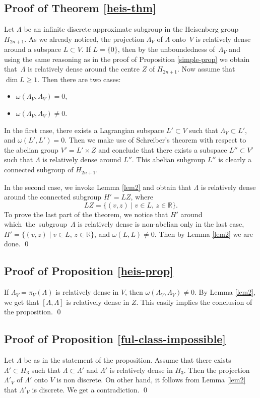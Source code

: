 \documentclass[JEP,XML,SOM,Unicode,NoEqCountersInSection]{cedram}
\newcommand{\bR}{\mathbb{R}}
\theoremstyle{plain}
\theoremstyle{definition}
\begin{document}
\subsection{Proof of Theorem \ref{heis-thm}}
Let $\Lambda$ be an infinite discrete approximate subgroup in the Heisenberg group $H_{2n+1}$. As we already noticed, the projection $\Lambda_V$ of $\Lambda$ onto~$V$ is relatively dense around a subspace $L \subset V$.
If $L = \{ 0 \}$, then by the unboundedness of~$\Lambda_V$ and using the same reasoning as in the proof of Proposition \ref{simple-prop} we obtain that~$\Lambda$ is relatively dense around the centre $Z$ of $H_{2n+1}$. Now assume that $\dim L \ge 1$. Then there are two cases:

\begin{itemize}
\item[(1)] $\omega(\Lambda_V, \Lambda_V) = 0$,
\item[(2)] $\omega(\Lambda_V,\Lambda_V) \neq 0$.
\end{itemize}

In the first case, there exists a Lagrangian subspace $L' \subset V$ such that $\Lambda_V \subset L'$, and $\omega(L',L') = 0$. Then we make use of Schreiber's theorem with respect to the abelian group $V' = L' \times Z$ and conclude that there exists a subspace $L'' \subset V'$ such that $\Lambda$ is relatively dense around $L''$. This abelian subgroup $L''$ is clearly a connected subgroup of $H_{2n+1}$.

In the second case, we invoke Lemma \ref{lem2} and obtain that $\Lambda$ is relatively dense around the connected subgroup
$H' = LZ$, where
\[
LZ = \{ (v,z) \mid v \in L,\, z \in \bR \}.
\]
To prove the last part of the theorem, we notice that $H'$ around which~the~subgroup~$\Lambda$ is relatively dense is non-abelian only in the last case, \ie \hbox{$H' \!=\!\{ (v,z) \mid v\!\in\!L,\, z\!\in\!\bR \}$}, and $\omega(L,L) \neq 0$. Then by Lemma \ref{lem2} we are done.
\qed

\subsection{Proof of Proposition \ref{heis-prop}} If $\Lambda_V = \pi_V(\Lambda)$ is relatively dense in $V$, then $\omega(\Lambda_V, \Lambda_V) \neq 0$. By Lemma \ref{lem2}, we get that $[\Lambda,\Lambda]$ is relatively dense in $Z$. This easily implies the conclusion of the proposition.
\qed

\subsection{Proof of Proposition \ref{ful-class-impossible}}
Let $\Lambda$ be as in the statement of the proposition. Assume that there exists $\Lambda' \subset H_3$ such that $\Lambda \subset \Lambda'$ and $\Lambda'$ is relatively dense in $H_3$. Then the projection $\Lambda'_V$ of $\Lambda'$ onto $V$ is non discrete. On other hand, it follows from Lemma \ref{lem2} that $\Lambda'_V$ is discrete. We get a contradiction.
\qed

\backmatter


\end{document}

